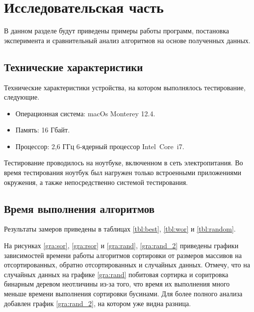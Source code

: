 \chapter{Исследовательская часть}

В данном разделе будут приведены примеры работы программ,
постановка эксперимента и сравнительный анализ алгоритмов на основе
полученных данных.

\section{Технические характеристики}

Технические характеристики устройства, на котором выполнялось тестирование,
следующие.

\begin{itemize}
	\item Операционная система: macOs Monterey 12.4\cite{ubuntu}.
	\item Память: 16 Гбайт.
	\item Процессор: 2,6 ГГц 6‑ядерный процессор Intel Core i7\cite{intel}.
\end{itemize}

Тестирование проводилось на ноутбуке, включенном в сеть электропитания.
Во время тестирования ноутбук был нагружен только встроенными приложениями
окружения, а также непосредственно системой тестирования.

\section{Время выполнения алгоритмов}

Результаты замеров приведены в таблицах \ref{tbl:best}, \ref{tbl:wor} и \ref{tbl:random}.

На рисунках \ref{gra:sor}, \ref{gra:rsor} и \ref{gra:rand}, \ref{gra:rand_2} приведены графики
зависимостей времени работы алгоритмов сортировки от размеров массивов
на отсортированных, обратно отсортированных и случайных данных.
Отмечу, что на случайных данных на графике \ref{gra:rand} побитовая сортирка и соритровка бинарным деревом неотличины из-за того, что время их выполнения много меньше времени выполнения сортировки бусинами. Для более полного анализа добавлен график \ref{gra:rand_2}, на котором уже видна разница.

